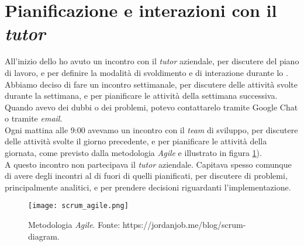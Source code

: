 \section{Pianificazione e interazioni con il \textit{tutor}}
All'inizio dello \stage{} ho avuto un incontro con il \textit{tutor} aziendale, per discutere del piano di lavoro, e per definire la modalità
di svoldimento e di interazione durante lo \stage.\\
Abbiamo deciso di fare un incontro settimanale, per discutere delle attività svolte durante la settimana, e per pianificare le attività
della settimana successiva.\\
Quando avevo dei dubbi o dei problemi, potevo contattarelo tramite Google Chat o tramite \textit{email}.\\
Ogni mattina alle 9:00 avevamo un incontro con il \textit{team} di sviluppo, per discutere delle attività svolte il giorno precedente, e per
pianificare le attività della giornata, come previsto dalla metodologia \textit{Agile} e illustrato in figura \ref*{fig:scrum_agile}).\\
A questo incontro non partecipava il \textit{tutor} aziendale. 
Capitava spesso comunque di avere degli incontri al di fuori di quelli pianificati, per discutere di problemi, principalmente analitici, 
e per prendere decisioni riguardanti l'implementazione.\\

\begin{figure}[h] 
  \centering 
  \texttt{[image: scrum\_agile.png]} 
  \caption{Metodologia \textit{Agile}. Fonte: https://jordanjob.me/blog/scrum-diagram. }
  \label{fig:scrum_agile}
\end{figure}